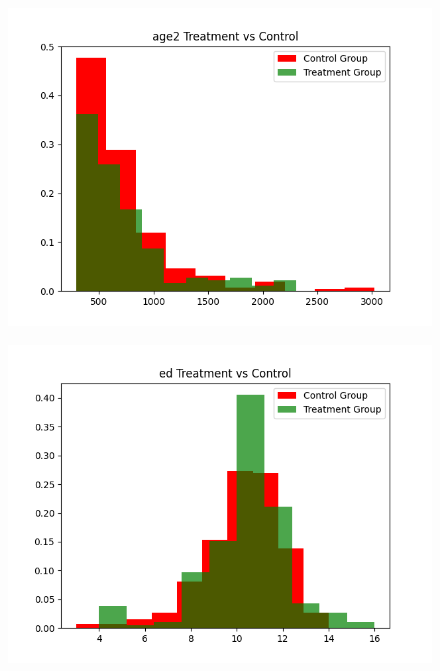 \documentclass{article}
\begin{document}
\begin{figure}
    \centering
    \includegraphics[width = 15 cm]{../age2_cts_hist_plot.png}
\end{figure}


\begin{figure}
    \centering
    \includegraphics[width = 15 cm]{../ed_cts_hist_plot.png}
\end{figure}
\end{document}
